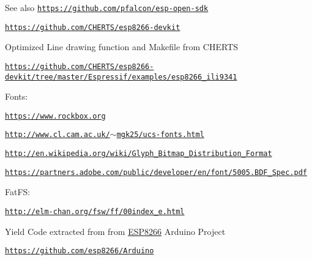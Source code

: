 \begin{DoxySeeAlso}{See also}
\href{https://github.com/pfalcon/esp-open-sdk}{\tt https\+://github.\+com/pfalcon/esp-\/open-\/sdk} 

\href{https://github.com/CHERTS/esp8266-devkit}{\tt https\+://github.\+com/\+C\+H\+E\+R\+T\+S/esp8266-\/devkit}
\begin{DoxyItemize}
\item Optimized Line drawing function and Makefile from C\+H\+E\+R\+TS 
\end{DoxyItemize}

\href{https://github.com/CHERTS/esp8266-devkit/tree/master/Espressif/examples/esp8266_ili9341}{\tt https\+://github.\+com/\+C\+H\+E\+R\+T\+S/esp8266-\/devkit/tree/master/\+Espressif/examples/esp8266\+\_\+ili9341}
\begin{DoxyItemize}
\item Fonts\+: 
\end{DoxyItemize}

\href{https://www.rockbox.org}{\tt https\+://www.\+rockbox.\+org} 

\href{http://www.cl.cam.ac.uk/~mgk25/ucs-fonts.html}{\tt http\+://www.\+cl.\+cam.\+ac.\+uk/$\sim$mgk25/ucs-\/fonts.\+html} 

\href{http://en.wikipedia.org/wiki/Glyph_Bitmap_Distribution_Format}{\tt http\+://en.\+wikipedia.\+org/wiki/\+Glyph\+\_\+\+Bitmap\+\_\+\+Distribution\+\_\+\+Format} 

\href{https://partners.adobe.com/public/developer/en/font/5005.BDF_Spec.pdf}{\tt https\+://partners.\+adobe.\+com/public/developer/en/font/5005.\+B\+D\+F\+\_\+\+Spec.\+pdf}
\begin{DoxyItemize}
\item Fat\+FS\+: 
\end{DoxyItemize}

\href{http://elm-chan.org/fsw/ff/00index_e.html}{\tt http\+://elm-\/chan.\+org/fsw/ff/00index\+\_\+e.\+html}
\begin{DoxyItemize}
\item Yield Code extracted from from \hyperlink{user__config_8h_af917fb5672b9339e228304f59f3b250a}{E\+S\+P8266} Arduino Project 
\end{DoxyItemize}

\href{https://github.com/esp8266/Arduino}{\tt https\+://github.\+com/esp8266/\+Arduino} 


\end{DoxySeeAlso}
